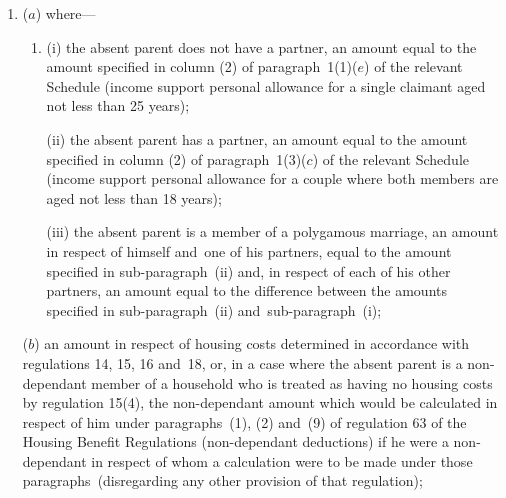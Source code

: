 \documentclass[12pt,a4paper]{article}
\begin{document}
\begin{enumerate}\item[]
($a$) where—
\begin{enumerate}\item[]
(i) the absent parent does not have a partner, an amount equal to the amount specified in column (2) of paragraph~1(1)($e$) of the relevant Schedule (income support personal allowance for a single claimant aged not less than 25 years);

(ii) the absent parent has a partner, an amount equal to the amount specified in column (2) of paragraph~1(3)($c$) of the relevant Schedule (income support personal allowance for a couple where both members are aged not less than 18 years);

(iii) the absent parent is a member of a polygamous marriage, an amount in respect of himself and~one of his partners, equal to the amount specified in sub-paragraph~(ii) and, in respect of each of his other partners, an amount equal to the difference between the amounts specified in sub-paragraph~(ii) and~sub-paragraph~(i);
\end{enumerate}

($b$) an amount in respect of housing costs determined in accordance with regulations 14, 15, 16 and~18, or, in a case where the absent parent is a non-dependant member of a household who is treated as having no housing costs by 
regulation 15(4),  %
the non-dependant amount which would be calculated in respect of him under 
paragraphs~(1), (2) and~(9) of regulation 63 of the Housing Benefit Regulations (non-dependant deductions) if he were a non-dependant in respect of whom a calculation were to be made under those paragraphs~(disregarding any other provision of that regulation);  %


%
%


\end{enumerate}
\end{document}
